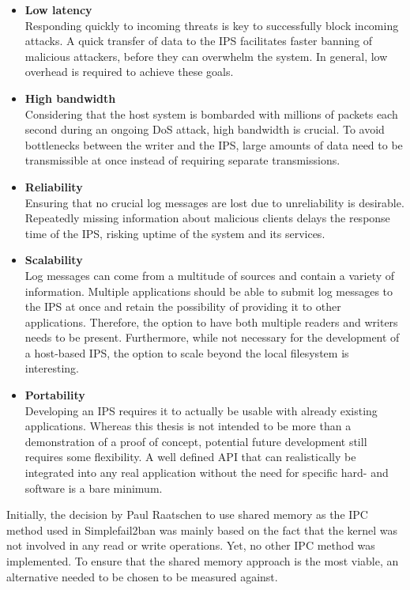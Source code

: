 \begin{itemize}
    \item \textbf{Low latency} \\
        Responding quickly to incoming threats is key to successfully block incoming attacks.
        A quick transfer of data to the IPS facilitates faster banning of malicious attackers, before they can overwhelm the system.
        In general, low overhead is required to achieve these goals.
    \item \textbf{High bandwidth} \\
        Considering that the host system is bombarded with millions of packets each second during an ongoing DoS attack, high bandwidth is crucial.
        To avoid bottlenecks between the writer and the IPS, large amounts of data need to be transmissible at once instead of requiring separate transmissions.
    \item \textbf{Reliability} \\
        Ensuring that no crucial log messages are lost due to unreliability is desirable.
        Repeatedly missing information about malicious clients delays the response time of the IPS, risking uptime of the system and its services.
    \item \textbf{Scalability} \\
        Log messages can come from a multitude of sources and contain a variety of information.
        Multiple applications should be able to submit log messages to the IPS at once and retain the possibility of providing it to other applications.
        Therefore, the option to have both multiple readers and writers needs to be present.
        Furthermore, while not necessary for the development of a host-based IPS, the option to scale beyond the local filesystem is interesting.
    \item \textbf{Portability} \\
        Developing an IPS requires it to actually be usable with already existing applications.
        Whereas this thesis is not intended to be more than a demonstration of a proof of concept, potential future development still requires some flexibility.
        A well defined API that can realistically be integrated into any real application without the need for specific hard- and software is a bare minimum.
\end{itemize}

Initially, the decision by Paul Raatschen to use shared memory as the IPC method used in Simplefail2ban was mainly based on the fact that the kernel was not involved in any read or write operations\cite{raatschen:ipc}.
Yet, no other IPC method was implemented.
To ensure that the shared memory approach is the most viable, an alternative needed to be chosen to be measured against.

